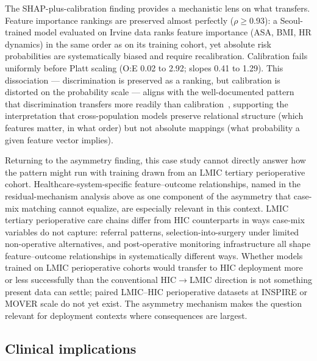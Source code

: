 The SHAP-plus-calibration finding provides a mechanistic lens on what transfers. Feature importance rankings are preserved almost perfectly ($\rho \geq 0.93$): a Seoul-trained model evaluated on Irvine data ranks feature importance (ASA, BMI, HR dynamics) in the same order as on its training cohort, yet absolute risk probabilities are systematically biased and require recalibration. Calibration fails uniformly before Platt scaling (O:E 0.02 to 2.92; slopes 0.41 to 1.29). This dissociation --- discrimination is preserved as a ranking, but calibration is distorted on the probability scale --- aligns with the well-documented pattern that discrimination transfers more readily than calibration~\cite{VanCalster2019}, supporting the interpretation that cross-population models preserve relational structure (which features matter, in what order) but not absolute mappings (what probability a given feature vector implies).

Returning to the asymmetry finding, this case study cannot directly answer how the pattern might run with training drawn from an LMIC tertiary perioperative cohort. Healthcare-system-specific feature--outcome relationships, named in the residual-mechanism analysis above as one component of the asymmetry that case-mix matching cannot equalize, are especially relevant in this context. LMIC tertiary perioperative care chains differ from HIC counterparts in ways case-mix variables do not capture: referral patterns, selection-into-surgery under limited non-operative alternatives, and post-operative monitoring infrastructure all shape feature--outcome relationships in systematically different ways. Whether models trained on LMIC perioperative cohorts would transfer to HIC deployment more or less successfully than the conventional HIC$\to$LMIC direction is not something present data can settle; paired LMIC--HIC perioperative datasets at INSPIRE or MOVER scale do not yet exist. The asymmetry mechanism makes the question relevant for deployment contexts where consequences are largest.

\subsection{Clinical implications}
\label{discussion:deployment}

